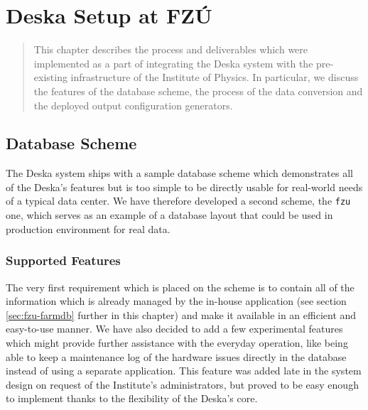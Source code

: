 \documentclass[deska]{subfiles}
\begin{document}
\chapter{Deska Setup at FZÚ}
\label{sec:fzu-setup}

\begin{abstract}
This chapter describes the process and deliverables which were implemented as a part of integrating the Deska system
with the pre-existing infrastructure of the Institute of Physics.  In particular, we discuss the features of the
database scheme, the process of the data conversion and the deployed output configuration generators.
\end{abstract}

\section{Database Scheme}
\label{sec:fzu-scheme}

The Deska system ships with a sample database scheme which demonstrates all of the Deska's features but is too simple
to be directly usable for real-world needs of a typical data center.  We have therefore developed a second scheme, the
{\tt fzu} one, which serves as an example of a database layout that could be used in production environment for real
data.

\subsection{Supported Features}

The very first requirement which is placed on the scheme is to contain all of the information which is already managed
by the in-house application (see section \ref{sec:fzu-farmdb} further in this chapter) and make it available in an
efficient and easy-to-use manner.  We have also decided to add a few experimental features which might provide further
assistance with the everyday operation, like being able to keep a maintenance log of the hardware issues directly in the
database instead of using a separate application.  This feature was added late in the system design on request of the
Institute's administrators, but proved to be easy enough to implement thanks to the flexibility of the Deska's core.
\end{document}
